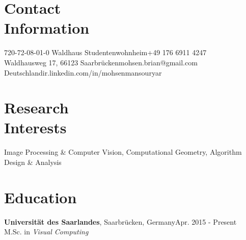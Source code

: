 \documentclass[margin,line]{resume}
\begin{document}
\begin{resume}


    \section{\mysidestyle Contact\\Information}\vspace{2mm}
	720-72-08-01-0 Waldhaus Studentenwohnheim\hfill{+49 176 6911 4247}\\
    Waldhausweg 17, 66123 Saarbr{\"u}cken\hfill{mohsen.brian@gmail.com}\\
    Deutschland\hfill{ir.linkedin.com/in/mohsenmansouryar}
    


    \section{\mysidestyle Research\\Interests}

     Image Processing \& Computer Vision, Computational Geometry, Algorithm Design \& Analysis


    \section{\mysidestyle Education}

	{\bf Universit{\"a}t des Saarlandes}, Saarbr{\"u}cken, Germany\hfill {\sf Apr. 2015 - Present}\vspace{1mm}\\
	M.Sc. in {\sl Visual Computing}


\end{resume}
\end{document}
